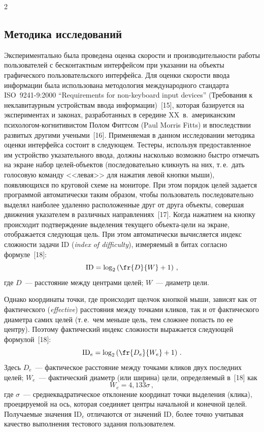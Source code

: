 \begin{multicols}{2}
\subsection{Методика исследований}

  Экспериментально была проведена оценка скорости и производительности 
работы пользователей с бесконтактным интерфейсом при указании на объекты 
графического пользовательского интерфейса. Для оценки скорости ввода 
информации была использована методология международного стандарта 
ISO~9241-9:2000 ``Requirements for non-keyboard input devices'' (Требования 
к неклавитаурным устройствам ввода информации)~[15], которая базируется на 
экспериментах и законах, разработанных в середине XX~в.\ американским 
пси\-хо\-ло\-гом-когни\-ти\-ви\-стом Полом Фиттсом (Paul Morris Fitts) и впоследствии 
развитых другими учеными~[16]. Применяемая в данном исследовании 
методика оценки интерфейса состоит в следующем. Тестеры, используя 
предоставленное им устройство указательного ввода, должны насколько 
возможно быстро отмечать на экране набор целей-объектов (последовательно 
кликнуть на них, т.\,е.\ дать голосовую команду <<левая>> для нажатия левой 
кнопки мыши), появляющихся по круговой схеме на мониторе. При этом 
порядок целей задается программой автоматически таким образом, чтобы 
пользователь последовательно выделял наиболее удаленно расположенные 
друг от друга объекты, совершая движения указателем в различных 
направлениях~[17]. Когда нажатием на кнопку происходит подтверждение 
выделения текущего объекта-цели на экране, отображается следующая цель. 
При этом автоматически вычисляется индекс сложности задачи ID
(\textit{index of difficulty}), измеряемый в битах согласно формуле~[18]:
  \begin{equation}
\mathrm{ID}=\log_2 \left( \fr{D}{W}+1\right)\,,
  \label{e1kar}
  \end{equation}
где $D$~--- расстояние между центрами целей; $W$~--- диаметр цели. 
  
  Однако координаты точки, где происходит щелчок кнопкой мыши, зависят 
как от фактического (\textit{effective}) расстояния между точками кликов, так и 
от фактического диаметра самих целей (т.\,е.\ чем меньше цель, тем сложнее 
попасть по ее центру). Поэтому фактический индекс сложности выражается 
следующей формулой~[18]: 
  \begin{equation}
\mathrm{ID}_e=\log_2\left( \fr{D_e}{W_e}+1\right)\,.
  \label{e2kar}
  \end{equation}
Здесь $D_e$~--- фактическое расстояние между точками кликов двух последних 
целей; $W_e$~--- фактический диаметр (или ширина) цели, определяемый 
в~[18] как
\begin{equation}
W_e=4{,}133 \sigma\,,
\label{e3kar}
\end{equation}
где $\sigma$~--- среднеквадратическое отклонение координат точки выделения 
(клика), проецируемой на ось, которая соединяет центры начальной и конечной 
целей. Получаемые значения ID$_e$ отличаются от значений ID, более точно 
учитывая качество выполнения тестового задания пользователем.


\end{multicols}
